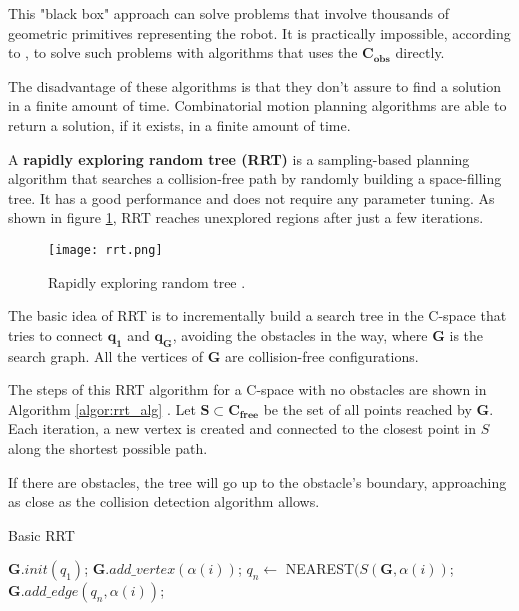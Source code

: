 This "black box" approach can solve problems that involve thousands of geometric primitives representing the robot. It is practically impossible, according to \citet{Handbook}, to solve such problems with algorithms that uses the $\bm{C_{obs}}$ directly.

The disadvantage of these algorithms is that they don't assure to find a solution in a finite amount of time. Combinatorial motion planning algorithms are able to return a solution, if it exists, in a finite amount of time.

A \textbf{rapidly exploring random tree (RRT)} is a sampling-based planning algorithm that searches a collision-free path by randomly building a space-filling tree. It has a good performance and does not require any parameter tuning. As shown in figure \ref{fig:rrt}, RRT reaches unexplored regions after just a few iterations. 
\begin{figure}[H]
	\centering
	\texttt{[image: rrt.png]}
	\vspace{-10pt}
	\caption[Rapidly exploring random tree]{Rapidly exploring random tree \citep[chap. 5, page 230]{planning}.}
	\vspace{-15pt}
	\label{fig:rrt}
\end{figure}
The basic idea of RRT is to incrementally build a search tree in the C-space that tries to connect $\bm{q_{1}}$ and $\bm{q_{G}}$, avoiding the obstacles in the way, where $\bm{G}$ is the search graph. All the vertices of $\bm{G}$ are collision-free configurations. 


The steps of this RRT algorithm for a C-space with no obstacles are shown in Algorithm \ref{algor:rrt_alg} \citep{planning}. Let $\bm{S}\subset \bm{C_{free}}$ be the set of all points reached by $\bm{G}$. Each iteration, a new vertex is created and connected to the closest point in $S$ along the shortest possible path. 

If there are obstacles, the tree will go up to the obstacle's boundary, approaching as close as the collision detection algorithm allows.

\begin{algorithm}[t!]
	\caption{Basic RRT}\label{algor:rrt_alg}
	\begin{algorithmic}[1]
		\State $\bm{G}.init(q_{1})$;
		\vspace{-2pt}
		\State $\bm{G}.add\_vertex(\alpha(i))$;
		\vspace{-2pt}
		\State $q_n \longleftarrow$ NEAREST$(S(\bm{G},\alpha(i))$;
		\vspace{-2pt}
		\State $\bm{G}.add\_edge(q_n,\alpha(i))$;
		\vspace{-2pt}
		\EndFor 
	\end{algorithmic}
\end{algorithm}

